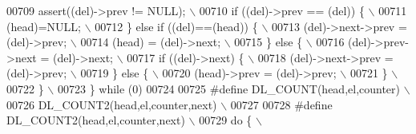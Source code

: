 \begin{DoxyCode}
00709 \textcolor{preprocessor}{  assert((del)->prev != NULL);                                                                 \(\backslash\)}
00710 \textcolor{preprocessor}{  if ((del)->prev == (del)) \{                                                                  \(\backslash\)}
00711 \textcolor{preprocessor}{      (head)=NULL;                                                                             \(\backslash\)}
00712 \textcolor{preprocessor}{  \} else if ((del)==(head)) \{                                                                  \(\backslash\)}
00713 \textcolor{preprocessor}{      (del)->next->prev = (del)->prev;                                                         \(\backslash\)}
00714 \textcolor{preprocessor}{      (head) = (del)->next;                                                                    \(\backslash\)}
00715 \textcolor{preprocessor}{  \} else \{                                                                                     \(\backslash\)}
00716 \textcolor{preprocessor}{      (del)->prev->next = (del)->next;                                                         \(\backslash\)}
00717 \textcolor{preprocessor}{      if ((del)->next) \{                                                                       \(\backslash\)}
00718 \textcolor{preprocessor}{          (del)->next->prev = (del)->prev;                                                     \(\backslash\)}
00719 \textcolor{preprocessor}{      \} else \{                                                                                 \(\backslash\)}
00720 \textcolor{preprocessor}{          (head)->prev = (del)->prev;                                                          \(\backslash\)}
00721 \textcolor{preprocessor}{      \}                                                                                        \(\backslash\)}
00722 \textcolor{preprocessor}{  \}                                                                                            \(\backslash\)}
00723 \textcolor{preprocessor}{\} while (0)}
00724 
00725 \textcolor{preprocessor}{#define DL\_COUNT(head,el,counter)                                                              \(\backslash\)}
00726 \textcolor{preprocessor}{    DL\_COUNT2(head,el,counter,next)                                                            \(\backslash\)}
00727 \textcolor{preprocessor}{}
00728 \textcolor{preprocessor}{#define DL\_COUNT2(head,el,counter,next)                                                        \(\backslash\)}
00729 \textcolor{preprocessor}{do \{                                                                                           \(\backslash\)}

\end{DoxyCode}
